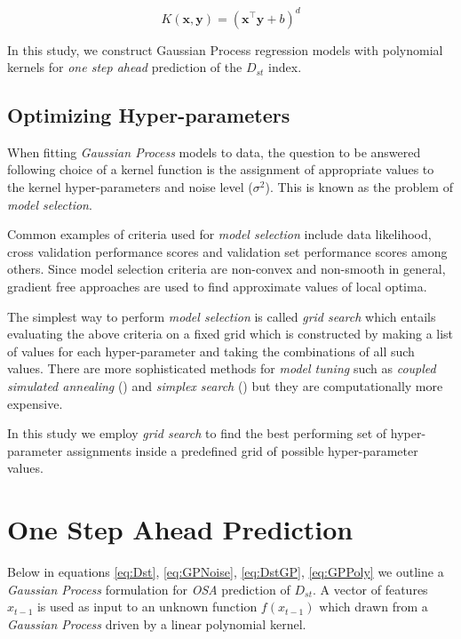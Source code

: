 \documentclass[referee,a4paper,12pt,traditabstract]{swsc}
\begin{document}
\begin{linenumbers}
\begin{equation}
    K(\mathbf{x}, \mathbf{y}) = (\mathbf{x}^\intercal \mathbf{y} + b)^d 
\end{equation}

In this study, we construct Gaussian Process regression models with polynomial kernels for \emph{one step ahead} prediction of the $D_{st}$ index. 

\subsection{Optimizing Hyper-parameters} \label{sec:hyp}

When fitting \emph{Gaussian Process} models to data, the question to be answered following choice of a kernel function is the assignment of appropriate values to the kernel hyper-parameters and noise level ($\sigma^2$). This is known as the problem of \emph{model selection}.

Common examples of criteria used for \emph{model selection} include data likelihood, cross validation performance scores and validation set performance scores among others. Since model selection criteria are non-convex and non-smooth in general, gradient free approaches are used to find approximate values of local optima.

The simplest way to perform \emph{model selection} is called \emph{grid search} which entails evaluating the above criteria on a fixed grid which is constructed by making a list of values for each hyper-parameter and taking the combinations of all such values. There are more sophisticated methods for \emph{model tuning} such as \emph{coupled simulated annealing} (\citet{Xavier-De-Souza2010}) and \emph{simplex search} (\citet{Nelder1965}) but they are computationally more expensive. 

In this study we employ \emph{grid search} to find the best performing set of hyper-parameter assignments inside a predefined grid of possible hyper-parameter values.


\section{One Step Ahead Prediction} \label{sec:osa}

Below in equations \ref{eq:Dst}, \ref{eq:GPNoise}, \ref{eq:DstGP}, \ref{eq:GPPoly} we outline a \emph{Gaussian Process} formulation for \emph{OSA} prediction of $D_{st}$. A vector of features $x_{t-1}$ is used as input to an unknown function $f(x_{t-1})$ which drawn from a \emph{Gaussian Process} driven by a linear polynomial kernel. 


\end{linenumbers}
\end{document}
